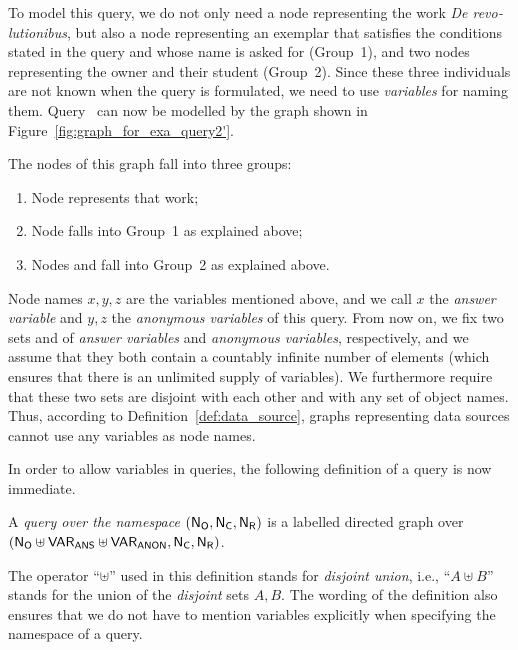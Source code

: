 To model this query, we do not only need a node representing the work \emph{\foreignlanguage{latin}{De revolutionibus}},
but also a node representing an exemplar that satisfies the conditions stated in the query and whose name is asked for (Group~1),
and two nodes representing the owner and their student (Group~2).
Since these three individuals are not known when the query is formulated,
we need to use \emph{variables} for naming them.
Query~
can now be modelled by the graph shown in Figure~\ref{fig:graph_for_exa_query2'}.



The nodes of this graph fall into three groups:
%
\begin{enumerate}[(1)]
  \item
    Node  represents that work;
  \item
    Node  falls into Group~1 as explained above;
  \item
    Nodes  and 
    fall into Group~2 as explained above.
\end{enumerate}
%
Node names $x,y,z$ are the variables mentioned above,
and we call $x$ the \emph{answer variable} and $y,z$ the \emph{anonymous variables}
of this query.
From now on, we fix two sets \VARANS and \VARANON
of \emph{answer variables} and \emph{anonymous variables}, respectively,
and we assume that they both contain a countably infinite number of elements
(which ensures that there is an unlimited supply of variables).
We furthermore require that these two sets are disjoint with each other
and with any set \NO of object names.
Thus, according to Definition~\ref{def:data_source},
graphs representing data sources cannot use any variables as node names.

In order to allow variables in queries,
the following definition of a query is now immediate. 
%
\begin{definition}
  A \emph{query over the namespace $(\mathsf{N}_\mathsf{O},\mathsf{N}_\mathsf{C},\mathsf{N}_\mathsf{R})$} is a labelled directed graph
  over $(\mathsf{N}_\mathsf{O} \uplus \mathsf{VAR}_\mathsf{ANS} \uplus \mathsf{VAR}_\mathsf{ANON}, \mathsf{N}_\mathsf{C}, \mathsf{N}_\mathsf{R})$.
\end{definition}
%
The operator \enquote{$\uplus$} used in this definition
stands for \emph{disjoint union}, i.e., \enquote{$A \uplus B$}
stands for the union of the \emph{disjoint} sets $A,B$.
The wording of the definition also ensures
that we do not have to mention variables explicitly when specifying the
namespace of a query.

